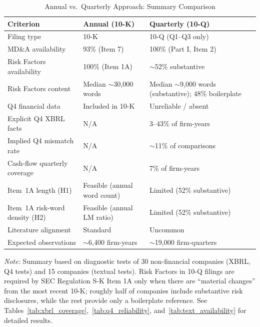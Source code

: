 \begin{table}[htbp]
\centering
\caption{Annual vs.\ Quarterly Approach: Summary Comparison}
\label{tab:annual_vs_quarterly}
\small
\begin{tabularx}{\textwidth}{lXX}
\toprule
Criterion & Annual (10-K) & Quarterly (10-Q) \\
\midrule
Filing type & 10-K & 10-Q (Q1--Q3 only) \\
MD\&A availability & 93\% (Item 7) & 100\% (Part I, Item 2) \\
Risk Factors availability & 100\% (Item 1A) & $\sim$52\% substantive \\
Risk Factors content & Median $\sim$30{,}000 words & Median $\sim$9{,}000 words (substantive); 48\% boilerplate \\
Q4 financial data & Included in 10-K & Unreliable / absent \\
Explicit Q4 XBRL facts & N/A & 3--43\% of firm-years \\
Implied Q4 mismatch rate & N/A & $\sim$11\% of comparisons \\
Cash-flow quarterly coverage & N/A & 7\% of firm-years \\
Item~1A length (H1) & Feasible (annual word count) & Limited (52\% substantive) \\
Item~1A risk-word density (H2) & Feasible (annual LM ratio) & Limited (52\% substantive) \\
Literature alignment & Standard & Uncommon \\
Expected observations & $\sim$6{,}400 firm-years & $\sim$19{,}000 firm-quarters \\
\bottomrule
\end{tabularx}
\par\smallskip
\begin{flushleft}\footnotesize
\textit{Note:} Summary based on diagnostic tests of 30 non-financial companies
(XBRL, Q4 tests) and 15 companies (textual tests). Risk Factors in 10-Q filings
are required by SEC Regulation S-K Item 1A only when there are ``material changes''
from the most recent 10-K; roughly half of companies include substantive risk
disclosures, while the rest provide only a boilerplate reference. See
Tables~\ref{tab:xbrl_coverage},~\ref{tab:q4_reliability},
and~\ref{tab:text_availability} for detailed results.
\end{flushleft}
\end{table}
